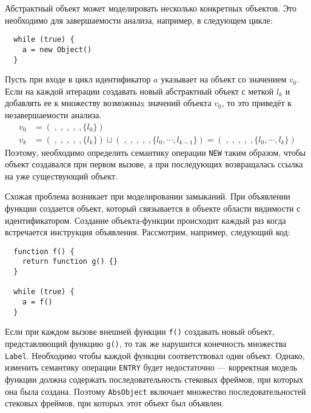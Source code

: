 Абстрактный объект может моделировать несколько конкретных объектов.
Это необходимо для завершаемости анализа, например, в следующем цикле:
\begin{lstlisting}
  while (true) {
    a = new Object()
  }
\end{lstlisting}
Пусть при входе в цикл идентификатор $a$ указывает на объект со
значением $v_0$. Если на каждой итерации создавать новый абстрактный
объект с меткой $l_k$ и добавлять ее к множеству возможныx значений
объекта $v_0$, то это приведёт к незавершаемости анализа.
\[
\begin{aligned}
 v_0 &= (\;, \;, \;,  \;,  \;, \{l_0\}) \\
v_{k} &= (\;, \;, \;,  \;,  \;, \{l_k\}) \sqcup (\;,
\;, \;,  \;,  \;, \{l_0, \cdots, l_{k-1}\}) = 
(\;, \;, \;, \;, \;, \{l_0, \cdots, l_k\})
\end{aligned}
\]
Поэтому, необходимо определить семантику операции \texttt{NEW} таким
образом, чтобы объект создавался при первом вызове, а при последующих
возвращалась ссылка на уже существующий объект.

Схожая проблема возникает при моделировании замыканий. При объявлении
функции создается объект, который связывается в объекте области
видимости с идентификатором. Создание объекта-функции происходит
каждый раз когда встречается инструкция объявления. Рассмотрим,
например, следующий код:
\begin{lstlisting}
  function f() {
    return function g() {}
  }

  while (true) {
    a = f()
  }
\end{lstlisting}
Если при каждом вызове внешней функции \texttt{f()} создавать новый
объект, представляющий функцию \texttt{g()}, то так же нарушится
конечность множества \texttt{Label}. Необходимо чтобы каждой функции
соответствовал один объект. Однако, изменить семантику операции
\texttt{ENTRY} будет недостаточно --- корректная модель функции должна
содержать последовательность стековых фреймов, при которых она была
создана.  Поэтому \texttt{AbsObject} включает множество
последовательностей стековых фреймов, при которых этот объект был
объявлен.
  
  

